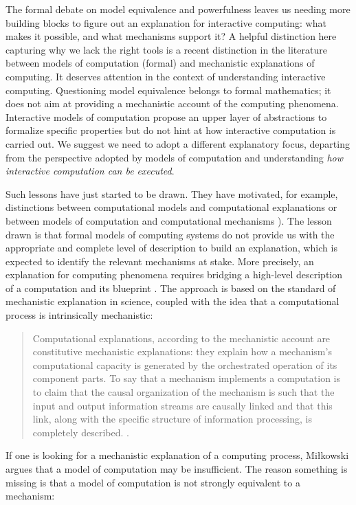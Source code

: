 \documentclass[a4paper, 11pt, twoside]{article}
\begin{document}
The formal debate on model equivalence and powerfulness leaves us needing more building blocks to figure out an explanation for interactive computing: what makes it possible, and what mechanisms support it? A helpful distinction here capturing why we lack the right tools is a recent distinction in the literature between models of computation (formal) and mechanistic explanations of computing. It deserves attention in the context of understanding interactive computing. Questioning model equivalence belongs to formal mathematics; it does not aim at providing a mechanistic account of the computing phenomena. Interactive models of computation propose an upper layer of abstractions to formalize specific properties but do not hint at how interactive computation is carried out. We suggest we need to adopt a different explanatory focus, departing from the perspective adopted by models of computation and understanding \textit{how interactive computation can be executed}. 

Such lessons have just started to be drawn. They have motivated, for example, distinctions between computational models and computational explanations \parencite{Klein2020} or between models of computation and computational mechanisms \parencite{Mikowski2014}). The lesson drawn is that formal models of computing systems do not provide us with the appropriate and complete level of description to build an explanation, which is expected to identify the relevant mechanisms at stake. More precisely, an explanation for computing phenomena requires bridging a high-level description of a computation and its blueprint \parencite{Mikowski2011, Mikowski2016}.
The approach is based on the standard of mechanistic explanation in science, coupled with the idea that a computational process is intrinsically mechanistic: 

\begin{quote}
Computational explanations, according to the mechanistic account are constitutive mechanistic explanations: they explain how a mechanism's computational capacity is generated by the orchestrated operation of its component parts. To say that a mechanism implements a computation is to claim that the causal organization of the mechanism is such that the input and output information streams are causally linked and that this link, along with the specific structure of information processing, is completely described. \parencite{Mikowski2014}.
\end{quote}

If one is looking for a mechanistic explanation of a computing process, Miłkowski argues that a model of computation may be insufficient. The reason something is missing is that a model of computation is not strongly equivalent to a mechanism: 
\end{document}
